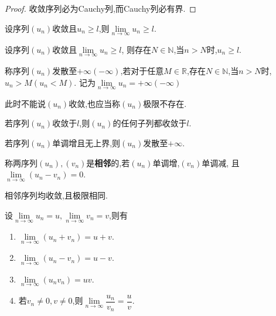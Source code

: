 \begin{proof}
    收敛序列必为Cauchy列,而Cauchy列必有界.
\end{proof}

\begin{prop}
    设序列$(u_n)$收敛且$u_n \geqslant l$,则$\lim\limits_{n\to\infty}u_n \geqslant l$.
\end{prop}

\begin{prop}
    设序列$(u_n)$收敛且$\lim\limits_{n\to\infty} u_n \geqslant l$,
    则存在$N \in \mathbb{N}$,当$n>N$时,$u_n \geqslant l$.
\end{prop}

\begin{deff}
    称序列$(u_n)$发散至$+\infty(-\infty)$,若对于任意$M \in \mathbb{R}$,存在$N \in \mathbb{N}$,当$n>N$时,$u_n>M(u_n<M)$.
    记为$\lim\limits_{n\to\infty}u_n=+\infty(-\infty)$
\end{deff}

\begin{rqq}
    此时不能说$(u_n)$收敛,也应当称$(u_n)$极限不存在.
\end{rqq}

\begin{prop}
    若序列$(u_n)$收敛于$l$,则$(u_n)$的任何子列都收敛于$l$.
\end{prop}

\begin{prop}
    若序列$(u_n)$单调增且无上界,则$(u_n)$发散至$+\infty$.
\end{prop}

\begin{deff}
    称两序列$(u_n),(v_n)$是\textbf{相邻}的,若$(u_n)$单调增,$(v_n)$单调减,
    且$\lim\limits_{n\to\infty}(u_n-v_n)=0$.
\end{deff}

\begin{thm}
    相邻序列均收敛,且极限相同.
\end{thm}

\begin{thm}[序列极限的运算]
    设$\lim\limits_{n\to\infty}u_n=u,\lim\limits_{n\to\infty}v_n=v$,则有
    \begin{enumerate}
        \item $\lim\limits_{n\to\infty}(u_n+v_n)=u+v$.
        \item $\lim\limits_{n\to\infty}(u_n-v_n)=u-v$.
        \item $\lim\limits_{n\to\infty}(u_nv_n)=uv$.
        \item 若$v_n \neq 0,v \neq 0$,则$\lim\limits_{n\to\infty}\dfrac{u_n}{v_n}=\dfrac{u}{v}$.
    \end{enumerate}
\end{thm}

